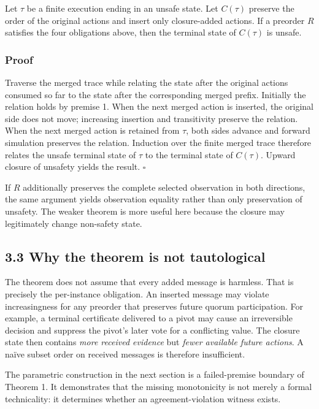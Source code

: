 \documentclass[10pt,a4paper]{article}
\begin{document}
Let \(\tau\) be a finite execution ending in an unsafe state. Let
\(C(\tau)\) preserve the order of the original actions and insert only
closure-added actions. If a preorder \(R\) satisfies the four
obligations above, then the terminal state of \(C(\tau)\) is unsafe.

\subsubsection{Proof}\label{proof}

Traverse the merged trace while relating the state after the original
actions consumed so far to the state after the corresponding merged
prefix. Initially the relation holds by premise 1. When the next merged
action is inserted, the original side does not move; increasing
insertion and transitivity preserve the relation. When the next merged
action is retained from \(\tau\), both sides advance and forward
simulation preserves the relation. Induction over the finite merged
trace therefore relates the unsafe terminal state of \(\tau\) to the
terminal state of \(C(\tau)\). Upward closure of unsafety yields the
result. \(\square\)

If \(R\) additionally preserves the complete selected observation in
both directions, the same argument yields observation equality rather
than only preservation of unsafety. The weaker theorem is more useful
here because the closure may legitimately change non-safety state.

\subsection{3.3 Why the theorem is not
tautological}\label{why-the-theorem-is-not-tautological}

The theorem does not assume that every added message is harmless. That
is precisely the per-instance obligation. An inserted message may
violate increasingness for any preorder that preserves future quorum
participation. For example, a terminal certificate delivered to a pivot
may cause an irreversible decision and suppress the pivot's later vote
for a conflicting value. The closure state then contains \emph{more
received evidence} but \emph{fewer available future actions}. A naïve
subset order on received messages is therefore insufficient.

The parametric construction in the next section is a failed-premise
boundary of Theorem 1. It demonstrates that the missing monotonicity is
not merely a formal technicality: it determines whether an
agreement-violation witness exists.
\end{document}
